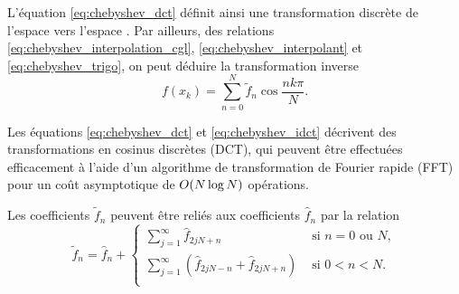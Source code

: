 L'équation \eqref{eq:chebyshev_dct} définit ainsi une transformation discrète de l'espace  vers l'espace . 
Par ailleurs, des relations \eqref{eq:chebyshev_interpolation_cgl}, \eqref{eq:chebyshev_interpolant} et \eqref{eq:chebyshev_trigo}, on peut déduire la transformation inverse
\begin{equation}
	f(x_k) = \sum_{n=0}^{N} \tilde{f}_n \cos \frac{n k \pi}{N}.
	\label{eq:chebyshev_idct}
\end{equation}

Les équations \eqref{eq:chebyshev_dct} et \eqref{eq:chebyshev_idct} décrivent des transformations en cosinus discrètes (DCT), qui peuvent être effectuées efficacement à l'aide d'un algorithme de transformation de Fourier rapide (FFT) pour un coût asymptotique de $O\!\left( {N \log N} \right)$ opérations.
\par
Les coefficients $\tilde{f}_n$ peuvent être reliés aux coefficients $\hat{f}_n$ par la relation
\begin{equation}
	\tilde{f}_n = \hat{f}_n + 
	\begin{cases}
		\displaystyle\sum_{j=1}^{\infty} \hat{f}_{2jN + n} & \text{\ si\ } n = 0 \text{\ ou\ } N,   \\[4ex]
		\displaystyle\sum_{j=1}^{\infty} \left( \hat{f}_{2jN - n} + \hat{f}_{2jN + n} \right) & \text{\ si\ } 0 < n < N.\\ 
	\end{cases}
	\label{eq:chebyshev_aliasing}
\end{equation}


